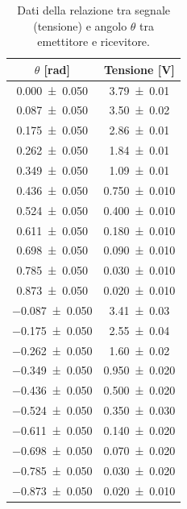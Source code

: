 \documentclass[a4paper]{article}
\begin{document}
\begin{table}[htbp]
\centering
\caption{Dati della relazione tra segnale (tensione) e angolo $\theta$ tra emettitore e ricevitore.}
\label{tab:dati_ampgeom_angolo}
\begin{tabular}{|c|c|}
\hline
$\theta$ [\si{\radian}] & Tensione [\si{\volt}] \\\hline\hline
\num{0.000 \pm 0.050} & \num{3.79 \pm 0.01} \\
\num{0.087 \pm 0.050} & \num{3.50 \pm 0.02} \\
\num{0.175 \pm 0.050} & \num{2.86 \pm 0.01} \\
\num{0.262 \pm 0.050} & \num{1.84 \pm 0.01} \\
\num{0.349 \pm 0.050} & \num{1.09 \pm 0.01} \\
\num{0.436 \pm 0.050} & \num{0.750 \pm 0.010} \\ %
\num{0.524 \pm 0.050} & \num{0.400 \pm 0.010} \\ %
\num{0.611 \pm 0.050} & \num{0.180 \pm 0.010} \\ %
\num{0.698 \pm 0.050} & \num{0.090 \pm 0.010} \\ %
\num{0.785 \pm 0.050} & \num{0.030 \pm 0.010} \\ %
\num{0.873 \pm 0.050} & \num{0.020 \pm 0.010} \\ %
\num{-0.087 \pm 0.050} & \num{3.41 \pm 0.03} \\
\num{-0.175 \pm 0.050} & \num{2.55 \pm 0.04} \\
\num{-0.262 \pm 0.050} & \num{1.60 \pm 0.02} \\
\num{-0.349 \pm 0.050} & \num{0.950 \pm 0.020} \\ %
\num{-0.436 \pm 0.050} & \num{0.500 \pm 0.020} \\ %
\num{-0.524 \pm 0.050} & \num{0.350 \pm 0.030} \\ %
\num{-0.611 \pm 0.050} & \num{0.140 \pm 0.020} \\ %
\num{-0.698 \pm 0.050} & \num{0.070 \pm 0.020} \\ %
\num{-0.785 \pm 0.050} & \num{0.030 \pm 0.020} \\ %
\num{-0.873 \pm 0.050} & \num{0.020 \pm 0.010} \\ %
\hline
\end{tabular}
\end{table}
\end{document}
